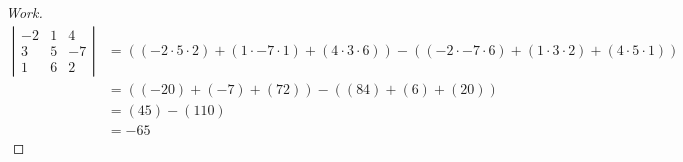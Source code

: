 \documentclass{article}
\begin{document}
\begin{proof}[Work]
    \begin{align*}
        \left\lvert\begin{array}{ccc}
                       -2 & 1 & 4  \\
                       3  & 5 & -7 \\
                       1  & 6 & 2
                   \end{array} \right\rvert & = ((-2 \cdot 5 \cdot 2)+(1 \cdot -7 \cdot 1)+(4 \cdot 3 \cdot 6))-((-2 \cdot -7 \cdot 6)+(1 \cdot 3 \cdot 2)+(4 \cdot 5 \cdot 1)) \\
                                      & = ((-20)+(-7)+(72))-((84)+(6)+(20))                                                                                                     \\
                                      & = (45)-(110)                                                                                                                            \\
                                      & = -65
    \end{align*}
\end{proof}
\qdash
\end{document}
